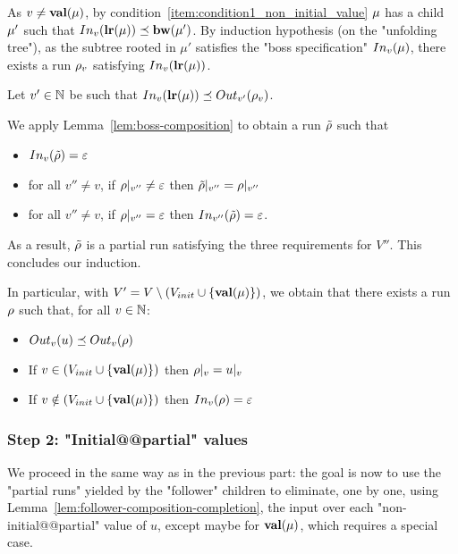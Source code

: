 	As $v \neq \valuelabel{\node}$, by condition~\ref{item:condition1_non_initial_value} $\node$ has a child $\node'$ such that $\vinput{v}{\localrunlabel{\mu}} \subword  \bosslabel{\node'}$.
	By induction hypothesis (on the "unfolding tree"), as the subtree rooted in $\mu'$ satisfies the "boss specification" $\vinput{v}{\mu}$, there exists a run $\run_v$ satisfying $\vinput{v}{\localrunlabel{\mu}}$.
	
	Let $v' \in \nats$ be such that $\vinput{v}{\localrunlabel{\node}} \subword \voutput{v'}{\run_v}$. 
	
	We apply Lemma~\ref{lem:boss-composition} to obtain a run $\Tilde{\run}$ such that 
		\begin{itemize}			
		\item $\vinput{v}{\Tilde{\run}} = \varepsilon$ 
		
		\item for all $v'' \neq v$, if $\vproj{v''}{\run} \neq \varepsilon$ then $\vproj{v''}{\Tilde{\run}} = \vproj{v''}{\run}$
		
		\item for all $v'' \neq v$, if $\vproj{v''}{\run} = \varepsilon$ then $\vinput{v''}{\Tilde{\run}} = \varepsilon$.
	\end{itemize}
	
	As a result, $\Tilde{\run}$ is a partial run satisfying the three requirements for $V''$.  This concludes our induction.
	
	In particular, with $V' = V\setminus (V_{init}\cup \set{\valuelabel{\node}})$, we obtain that there exists a run $\run$ such that,
	for all $v \in \nats$:
	\begin{itemize}
		\item $\voutput{v}{u} \subword \voutput{v}{\run}$
		
		\item If $v \in (V_{init}\cup \set{\valuelabel{\node}})$ then $\vproj{v}{\run} = \vproj{v}{u}$
		
		\item If $v \notin (V_{init}\cup \set{\valuelabel{\node}})$ then $\vinput{v}{\run} = \epsilon$
	\end{itemize}  
	
	\subsubsection{Step 2: "Initial@@partial" values}
	\label{sec:tree-to-run-step-two}
	
	We proceed in the same way as in the previous part: the goal is now to use the "partial runs" yielded by the "follower" children to eliminate, one by one, using Lemma~\ref{lem:follower-composition-completion}, the input over each "non-initial@@partial" value of $u$, except maybe for $\valuelabel{\node}$, which requires a special case.
	
